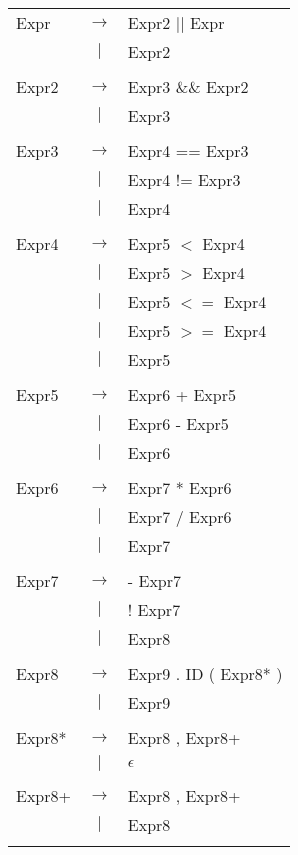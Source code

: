 \documentclass{article}
\begin{document}
\begin{tabular}{ l c l }

	Expr & $\rightarrow$ & Expr2 $||$ Expr \\
	&$|$& Expr2 \\
	\\

	Expr2 & $\rightarrow$ & Expr3 $\&\&$ Expr2 \\
	&$|$& Expr3 \\
	\\

	Expr3 & $\rightarrow$ & Expr4 == Expr3 \\
	&$|$& Expr4 != Expr3 \\
	&$|$& Expr4 \\
	\\

	Expr4 & $\rightarrow$ & Expr5 $<$ Expr4 \\
	&$|$& Expr5 $>$ Expr4 \\
	&$|$& Expr5 $<=$ Expr4 \\
	&$|$& Expr5 $>=$ Expr4 \\
	&$|$& Expr5 \\
	\\

	Expr5 & $\rightarrow$ & Expr6 + Expr5 \\
	&$|$& Expr6 - Expr5 \\
	&$|$& Expr6 \\
	\\

	Expr6 & $\rightarrow$ & Expr7 * Expr6 \\
	&$|$& Expr7 / Expr6 \\
	&$|$& Expr7 \\
	\\

	Expr7 & $\rightarrow$ & - Expr7 \\
	&$|$& ! Expr7 \\
	&$|$& Expr8 \\
	\\

	Expr8 & $\rightarrow$ & Expr9 . ID ( Expr8* ) \\
	&$|$& Expr9 \\
	\\

	Expr8* & $\rightarrow$ & Expr8 , Expr8+ \\
  	& $|$ & $\epsilon$ \\
	\\

	Expr8+ & $\rightarrow$ & Expr8 , Expr8+ \\
  	& $|$ & Expr8 \\
	\\


\end{tabular}
\end{document}
